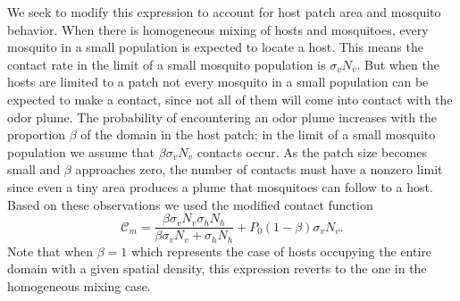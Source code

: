 \documentclass[12pt]{article}
\newif\ifcommentsw
\newcommand{\comment}[1]{\ifcommentsw  $\blacktriangleright$\ \textbf{#1}\ $\blacktriangleleft$ \fi}
\begin{document}
We seek to modify this expression to account for host patch area and mosquito behavior.  When there is homogeneous mixing of hosts and mosquitoes, every mosquito in a small population is expected to locate a host. This means the contact rate in the limit of a small mosquito population is $\sigma_v N_v$. But when the hosts are limited to a patch not every mosquito in a small population can be expected to make a contact, since not all of them will come into contact with the odor plume. 
The probability of encountering an odor plume increases with
 the proportion $\beta$ of the domain in the host
patch; in the limit of a small mosquito population we assume that $\beta \sigma_v N_v$ contacts occur.
As the patch size becomes small and $\beta$ approaches
zero, the number of contacts must have a nonzero limit since
even a tiny area produces a plume that mosquitoes can follow to
a host. Based on these observations we used the modified
contact function
\begin{equation}
	\mathcal{C}_m 	= \frac{\beta\sigma_v N_v\sigma_h N_h}{\beta\sigma_v N_v + \sigma_h N_h} + P_0(1-\beta)\sigma_v N_v. \label{eqn:Cm}
\end{equation}
Note that when $\beta=1$ which represents the case of hosts
occupying the entire domain with a given spatial density, this
expression reverts to the one in the homogeneous mixing case.
\end{document}
